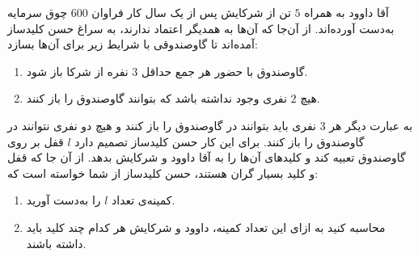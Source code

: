 \EXERCISE
آقا داوود به همراه
$5$
تن از شرکایش پس از یک سال کار فراوان
$600$
چوق سرمایه به‌دست آورده‌اند. از آن‌جا که آن‌ها به همدیگر اعتماد ندارند، به سراغ حسن کلیدساز آمده‌اند تا گاوصندوقی با شرایط زیر برای آن‌ها بسازد:
\begin{enumerate}
\item
گاوصندوق با حضور هر جمع حداقل
$3$
نفره از شرکا باز شود.
\item
هیچ
$2$
نفری وجود نداشته باشد که بتوانند گاوصندوق را باز کنند.
\end{enumerate}
به عبارت دیگر هر
$3$
نفری باید بتوانند در گاوصندوق را باز کنند و هیچ دو نفری نتوانند در گاوصندوق را باز کنند. برای این کار حسن کلیدساز تصمیم دارد
$l$
قفل بر روی گاوصندوق تعبیه کند و کلیدهای آن‌ها را به آقا داوود و شرکایش بدهد. از آن جا که قفل و کلید بسیار گران هستند، حسن کلیدساز از شما خواسته است که:
\begin{enumerate}
\item
کمینه‌ی تعداد
$l$
را به‌دست آورید.
\item
محاسبه کنید به ازای این تعداد کمینه، داوود و شرکایش هر کدام چند کلید باید داشته باشند.
\end{enumerate}